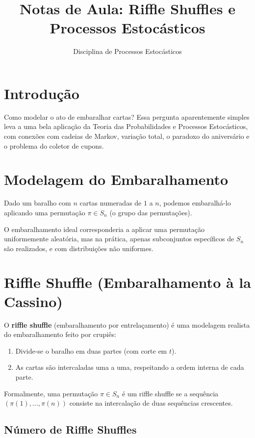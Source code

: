 \documentclass[12pt]{article}
\title{Notas de Aula: Riffle Shuffles e Processos Estocásticos}
\author{Disciplina de Processos Estocásticos}
\date{}
\begin{document}
\maketitle

\section*{Introdução}

Como modelar o ato de embaralhar cartas? Essa pergunta aparentemente simples leva a uma bela aplicação da Teoria das Probabilidades e Processos Estocásticos, com conexões com cadeias de Markov, variação total, o paradoxo do aniversário e o problema do coletor de cupons.

\section{Modelagem do Embaralhamento}

Dado um baralho com $n$ cartas numeradas de $1$ a $n$, podemos embaralhá-lo aplicando uma permutação $\pi \in S_n$ (o grupo das permutações).

O embaralhamento ideal corresponderia a aplicar uma permutação uniformemente aleatória, mas na prática, apenas subconjuntos específicos de $S_n$ são realizados, e com distribuições não uniformes.

\section{Riffle Shuffle (Embaralhamento à la Cassino)}

O \textbf{riffle shuffle} (embaralhamento por entrelaçamento) é uma modelagem realista do embaralhamento feito por crupiês:

\begin{enumerate}[label=(\alph*)]
    \item Divide-se o baralho em duas partes (com corte em $t$).
    \item As cartas são intercaladas uma a uma, respeitando a ordem interna de cada parte.
\end{enumerate}

Formalmente, uma permutação $\pi \in S_n$ é um riffle shuffle se a sequência $(\pi(1), \ldots, \pi(n))$ consiste na intercalação de duas sequências crescentes.

\subsection*{Número de Riffle Shuffles}
\end{document}
